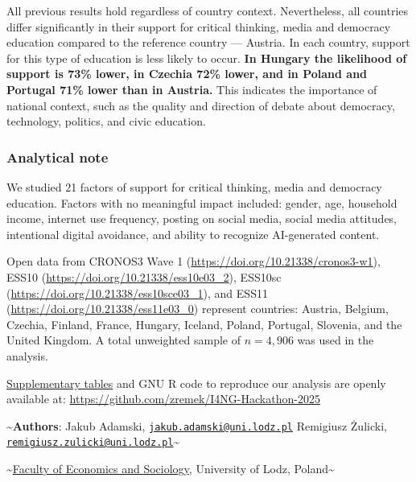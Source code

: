 \documentclass[
]{article}
\begin{document}
All previous results hold regardless of country context. Nevertheless,
all countries differ significantly in their support for critical
thinking, media and democracy education compared to the reference
country --- Austria. In each country, support for this type of education
is less likely to occur.
\textbf{In Hungary the likelihood of support is 73\% lower, in Czechia 72\% lower, and in Poland and Portugal 71\% lower than in Austria.}
This indicates the importance of national context, such as the quality
and direction of debate about democracy, technology, politics, and civic
education.

\subsubsection{Analytical note}\label{analytical-note}

\begin{flushleft}
\footnotesize

We studied 21 factors of support for critical thinking, media and democracy education. Factors with no meaningful impact included: gender, age, household income, internet use frequency, posting on social media, social media attitudes, intentional digital avoidance, and ability to recognize AI-generated content.

Open data from CRONOS3 Wave 1 (\url{https://doi.org/10.21338/cronos3-w1}), ESS10 (\url{https://doi.org/10.21338/ess10e03_2}), ESS10sc (\url{https://doi.org/10.21338/ess10sce03_1}), and ESS11 (\url{https://doi.org/10.21338/ess11e03_0}) represent countries: Austria, Belgium, Czechia, Finland, France, Hungary, Iceland, Poland, Portugal, Slovenia, and the United Kingdom. A total unweighted sample of \(n = 4{,}906\) was used in the analysis.

\href{https://github.com/zremek/I4NG-Hackathon-2025/tree/main/supplementary_tables}{Supplementary tables} and GNU R code to reproduce our analysis are openly available at: \url{https://github.com/zremek/I4NG-Hackathon-2025}
\normalsize
\end{flushleft}

\textasciitilde{}\textbf{Authors}: Jakub Adamski,
\href{mailto:jakub.adamski@uni.lodz.pl}{\nolinkurl{jakub.adamski@uni.lodz.pl}}
Remigiusz Żulicki,
\href{mailto:remigiusz.zulicki@uni.lodz.pl}{\nolinkurl{remigiusz.zulicki@uni.lodz.pl}}\textasciitilde{}

\textasciitilde{}\href{https://www.eksoc.uni.lodz.pl/en/about-the-faculty/get-to-know-eksoc}{Faculty
of Economics and Sociology}, University of Lodz, Poland\textasciitilde{}
\end{document}
